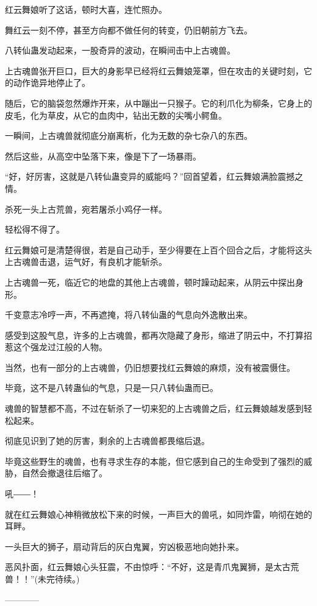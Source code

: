 \begin{this_body}
红云舞娘听了这话，顿时大喜，连忙照办。

舞红云一刻不停，甚至方向都不做任何的转变，仍旧朝前方飞去。

八转仙蛊发动起来，一股奇异的波动，在瞬间击中上古魂兽。

上古魂兽张开巨口，巨大的身影早已经将红云舞娘笼罩，但在攻击的关键时刻，它的动作诡异地停止了。

随后，它的脑袋忽然爆炸开来，从中蹦出一只猴子。它的利爪化为柳条，它身上的皮毛，化为草皮，从它的血肉中，钻出无数的尖嘴小鳄鱼。

一瞬间，上古魂兽就彻底分崩离析，化为无数的杂七杂八的东西。

然后这些，从高空中坠落下来，像是下了一场暴雨。

“好，好厉害，这就是八转仙蛊变异的威能吗？”回首望着，红云舞娘满脸震撼之情。

杀死一头上古荒兽，宛若屠杀小鸡仔一样。

轻松得不得了。

红云舞娘可是清楚得很，若是自己动手，至少得要在上百个回合之后，才能将这头上古魂兽击退，运气好，有良机才能斩杀。

上古魂兽一死，临近它的地盘的其他上古魂兽，顿时躁动起来，从阴云中探出身形。

千变意志冷哼一声，不再遮掩，将八转仙蛊的气息向外逸散出来。

感受到这股气息，许多的上古魂兽，都再次隐藏了身形，缩进了阴云中，不打算招惹这个强龙过江般的人物。

当然，也有一部分的上古魂兽，仍旧想要找红云舞娘的麻烦，没有被震慑住。

毕竟，这不是八转蛊仙的气息，只是一只八转仙蛊而已。

魂兽的智慧都不高，不过在斩杀了一切来犯的上古魂兽之后，红云舞娘越发感到轻松起来。

彻底见识到了她的厉害，剩余的上古魂兽都畏缩后退。

毕竟这些野生的魂兽，也有寻求生存的本能，但它感到自己的生命受到了强烈的威胁，自然会撤退往后缩了。

吼――！

就在红云舞娘心神稍微放松下来的时候，一声巨大的兽吼，如同炸雷，响彻在她的耳畔。

一头巨大的狮子，扇动背后的灰白鬼翼，穷凶极恶地向她扑来。

恶风扑面，红云舞娘心头狂震，不由惊呼：“不好，这是青爪鬼翼狮，是太古荒兽！！”(未完待续。)

------------

\end{this_body}

